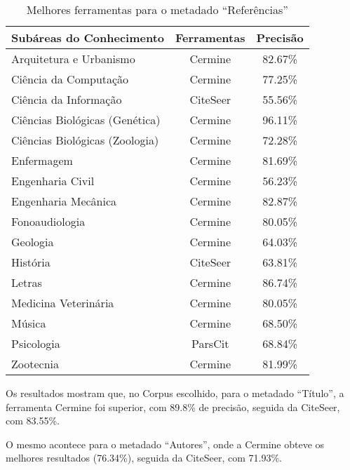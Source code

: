 \begin{table}
    \caption{Melhores ferramentas para o metadado ``Referências''}
    \begin{center}
        \begin{tabular}{|l|c|c|}
            \hline 
            \textbf{Subáreas do Conhecimento} & \textbf{Ferramentas} & \textbf{Precisão} \\ 
            \hline 
            Arquitetura e Urbanismo & Cermine & 82.67\% \\ \hline
            Ciência da Computação & Cermine & 77.25\% \\ \hline
            Ciência da Informação & CiteSeer & 55.56\% \\ \hline
            Ciências Biológicas (Genética) & Cermine & 96.11\% \\ \hline
            Ciências Biológicas (Zoologia) & Cermine & 72.28\% \\ \hline
            Enfermagem & Cermine & 81.69\% \\ \hline
            Engenharia Civil & Cermine & 56.23\% \\ \hline
            Engenharia Mecânica & Cermine & 82.87\% \\ \hline
            Fonoaudiologia & Cermine & 80.05\% \\ \hline
            Geologia & Cermine & 64.03\% \\ \hline
            História & CiteSeer & 63.81\% \\ \hline
            Letras & Cermine & 86.74\% \\ \hline
            Medicina Veterinária & Cermine & 80.05\% \\ \hline
            Música & Cermine & 68.50\% \\ \hline
            Psicologia & ParsCit & 68.84\% \\ \hline
            Zootecnia & Cermine & 81.99\% \\ \hline
        \end{tabular}
    \end{center}
    \label{tab:areas-references-tools}
\end{table}

Os resultados mostram que, no Corpus escolhido, para o metadado ``Título'', a ferramenta Cermine foi superior, com 89.8\% de precisão, seguida da CiteSeer, com 83.55\%.

O mesmo acontece para o metadado ``Autores'', onde a Cermine obteve os melhores resultados (76.34\%), seguida da CiteSeer, com 71.93\%.

